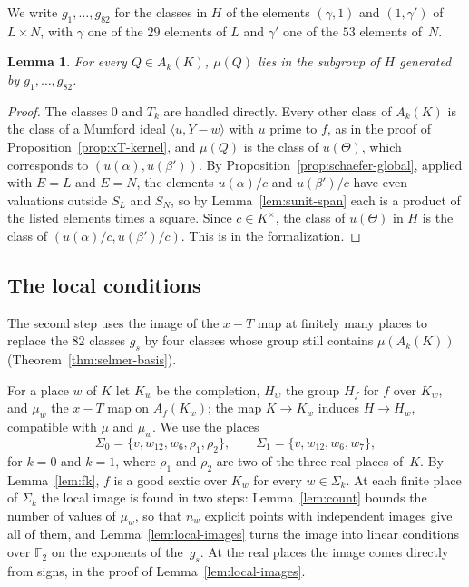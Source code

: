 \documentclass[11pt]{amsart}
\newtheorem{lemma}[theorem]{Lemma}
\theoremstyle{definition}
\numberwithin{equation}{section}
\newcommand{\F}{\mathbb{F}}
\newcommand{\lean}[1]{\ignorespaces}
\begin{document}
We write $g_1,\dots,g_{82}$ for the classes in $H$ of the elements $(\gamma,1)$ and $(1,\gamma')$ of $L\times N$, with $\gamma$ one of the $29$ elements of $L$ and $\gamma'$ one of the $53$ elements of~$N$.

\begin{lemma}\label{lem:global-span}\lean{FurioLombardo.Discharge.SelmerBasis.GlobalK21.globalSpan_gK}
For every $Q\in A_k(K)$, $\mu(Q)$ lies in the subgroup of $H$ generated by $g_1,\dots,g_{82}$.
\end{lemma}

\begin{proof}
The classes $0$ and $T_k$ are handled directly. Every other class of $A_k(K)$ is the class of a Mumford ideal $\langle u,Y-w\rangle$ with $u$ prime to $f$, as in the proof of Proposition~\ref{prop:xT-kernel}, and $\mu(Q)$ is the class of $u(\Theta)$, which corresponds to $(u(\alpha),u(\beta'))$. By Proposition~\ref{prop:schaefer-global}, applied with $E=L$ and $E=N$, the elements $u(\alpha)/c$ and $u(\beta')/c$ have even valuations outside $S_L$ and $S_N$, so by Lemma~\ref{lem:sunit-span} each is a product of the listed elements times a square. Since $c\in K^\times$, the class of $u(\Theta)$ in $H$ is the class of $(u(\alpha)/c,u(\beta')/c)$. This is  in the formalization.
\end{proof}

\subsection{The local conditions}
The second step uses the image of the $x-T$ map at finitely many places to replace the $82$ classes $g_s$ by four classes whose group still contains $\mu(A_k(K))$ (Theorem~\ref{thm:selmer-basis}).


For a place $w$ of $K$ let $K_w$ be the completion, $H_w$ the group $H_{f}$ for $f$ over $K_w$, and $\mu_w$ the $x-T$ map on $A_{f}(K_w)$; the map $K\to K_w$ induces $H\to H_w$, compatible with $\mu$ and $\mu_w$. We use the places
\[
\Sigma_0=\{v,w_{12},w_6,\rho_1,\rho_2\},\qquad\Sigma_1=\{v,w_{12},w_6,w_7\},
\]
for $k=0$ and $k=1$, where $\rho_1$ and $\rho_2$ are two of the three real places of~$K$. By Lemma~\ref{lem:fk}, $f$ is a good sextic over $K_w$ for every $w\in\Sigma_k$. At each finite place of $\Sigma_k$ the local image is found in two steps: Lemma~\ref{lem:count} bounds the number of values of $\mu_w$, so that $n_w$ explicit points with independent images give all of them, and Lemma~\ref{lem:local-images} turns the image into linear conditions over $\F_2$ on the exponents of the~$g_s$. At the real places the image comes directly from signs, in the proof of Lemma~\ref{lem:local-images}.
\end{document}
